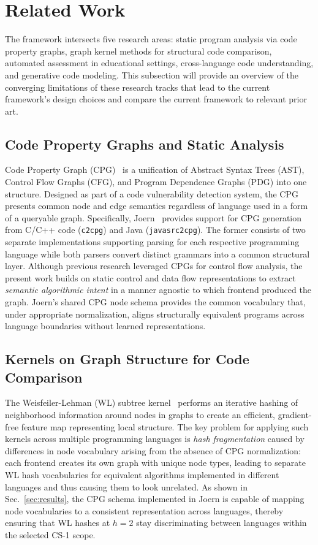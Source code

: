 \section{Related Work}
\label{sec:related_work}

The framework intersects five research areas: static program analysis via code property graphs, graph kernel methods for structural code comparison, automated assessment in educational settings, cross-language code understanding, and generative code modeling. This subsection will provide an overview of the converging limitations of these research tracks that lead to the current framework's design choices and compare the current framework to relevant prior art.

\subsection{Code Property Graphs and Static Analysis}
Code Property Graph (CPG)~\cite{ref_yamaguchi2014} is a unification of Abstract Syntax Trees (AST), Control Flow Graphs (CFG), and Program Dependence Graphs (PDG) into one structure. Designed as part of a code vulnerability detection system, the CPG presents common node and edge semantics regardless of language used in a form of a queryable graph. Specifically, Joern~\cite{ref_joern_platform} provides support for CPG generation from C/C++ code (\texttt{c2cpg}) and Java (\texttt{javasrc2cpg}). The former consists of two separate implementations supporting parsing for each respective programming language while both parsers convert distinct grammars into a common structural layer. Although previous research leveraged CPGs for control flow analysis, the present work builds on static control and data flow representations to extract \textit{semantic algorithmic intent} in a manner agnostic to which frontend produced the graph. Joern's shared CPG node schema provides the common vocabulary that, under appropriate normalization, aligns structurally equivalent programs across language boundaries without learned representations.

\subsection{Kernels on Graph Structure for Code Comparison}
The Weisfeiler-Lehman (WL) subtree kernel~\cite{ref_shervashidze2011,ref_weisfeiler68} performs an iterative hashing of neighborhood information around nodes in graphs to create an efficient, gradient-free feature map representing local structure. The key problem for applying such kernels across multiple programming languages is \textit{hash fragmentation} caused by differences in node vocabulary arising from the absence of CPG normalization: each frontend creates its own graph with unique node types, leading to separate WL hash vocabularies for equivalent algorithms implemented in different languages and thus causing them to look unrelated. As shown in Sec.~\ref{sec:results}, the CPG schema implemented in Joern is capable of mapping node vocabularies to a consistent representation across languages, thereby ensuring that WL hashes at $h=2$ stay discriminating between languages within the selected CS-1 scope.

